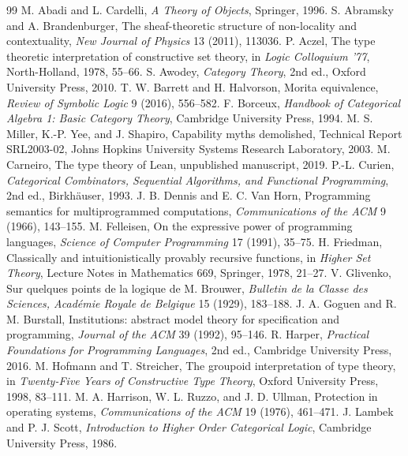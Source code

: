 \begin{thebibliography}{99}
 M. Abadi and L. Cardelli, \emph{A Theory of Objects}, Springer, 1996.
 S. Abramsky and A. Brandenburger, The sheaf-theoretic structure of non-locality and contextuality, \emph{New Journal of Physics} 13 (2011), 113036.
 P. Aczel, The type theoretic interpretation of constructive set theory, in \emph{Logic Colloquium '77}, North-Holland, 1978, 55--66.
 S. Awodey, \emph{Category Theory}, 2nd ed., Oxford University Press, 2010.
 T. W. Barrett and H. Halvorson, Morita equivalence, \emph{Review of Symbolic Logic} 9 (2016), 556--582.
 F. Borceux, \emph{Handbook of Categorical Algebra 1: Basic Category Theory}, Cambridge University Press, 1994.
 M. S. Miller, K.-P. Yee, and J. Shapiro, Capability myths demolished, Technical Report SRL2003-02, Johns Hopkins University Systems Research Laboratory, 2003.
 M. Carneiro, The type theory of Lean, unpublished manuscript, 2019.
 P.-L. Curien, \emph{Categorical Combinators, Sequential Algorithms, and Functional Programming}, 2nd ed., Birkh\"auser, 1993.
 J. B. Dennis and E. C. Van Horn, Programming semantics for multiprogrammed computations, \emph{Communications of the ACM} 9 (1966), 143--155.
 M. Felleisen, On the expressive power of programming languages, \emph{Science of Computer Programming} 17 (1991), 35--75.
 H. Friedman, Classically and intuitionistically provably recursive functions, in \emph{Higher Set Theory}, Lecture Notes in Mathematics 669, Springer, 1978, 21--27.
 V. Glivenko, Sur quelques points de la logique de M. Brouwer, \emph{Bulletin de la Classe des Sciences, Acad\'emie Royale de Belgique} 15 (1929), 183--188.
 J. A. Goguen and R. M. Burstall, Institutions: abstract model theory for specification and programming, \emph{Journal of the ACM} 39 (1992), 95--146.
 R. Harper, \emph{Practical Foundations for Programming Languages}, 2nd ed., Cambridge University Press, 2016.
 M. Hofmann and T. Streicher, The groupoid interpretation of type theory, in \emph{Twenty-Five Years of Constructive Type Theory}, Oxford University Press, 1998, 83--111.
 M. A. Harrison, W. L. Ruzzo, and J. D. Ullman, Protection in operating systems, \emph{Communications of the ACM} 19 (1976), 461--471.
 J. Lambek and P. J. Scott, \emph{Introduction to Higher Order Categorical Logic}, Cambridge University Press, 1986.

\end{thebibliography}
